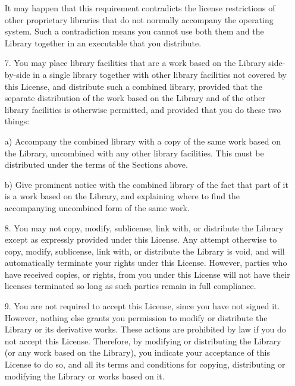 \begin{multicols}{3}
\begin{itemize}
   It may happen that this requirement contradicts the license restrictions
   of other proprietary libraries that do not normally accompany the
   operating system. Such a contradiction means you cannot use both them
   and the Library together in an executable that you distribute.
   
 \item[7.] You may place library facilities that are a work based on
   the Library side-by-side in a single library together with other
   library facilities not covered by this License, and distribute such
   a combined library, provided that the separate distribution of the
   work based on the Library and of the other library facilities is
   otherwise permitted, and provided that you do these two things:

      a) Accompany the combined library with a copy of the same work based
	 on the Library, uncombined with any other library facilities. This
	 must be distributed under the terms of the Sections above.

      b) Give prominent notice with the combined library of the fact that
	 part of it is a work based on the Library, and explaining where to
	 find the accompanying uncombined form of the same work.
         
       \item[8.] You may not copy, modify, sublicense, link with, or
         distribute the Library except as expressly provided under
         this License. Any attempt otherwise to copy, modify,
         sublicense, link with, or distribute the Library is void, and
         will automatically terminate your rights under this License.
         However, parties who have received copies, or rights, from
         you under this License will not have their licenses
         terminated so long as such parties remain in full compliance.
         
       \item[9.] You are not required to accept this License, since
         you have not signed it. However, nothing else grants you
         permission to modify or distribute the Library or its
         derivative works. These actions are prohibited by law if you
         do not accept this License. Therefore, by modifying or
         distributing the Library (or any work based on the Library),
         you indicate your acceptance of this License to do so, and
         all its terms and conditions for copying, distributing or
         modifying the Library or works based on it.
         

\end{itemize}
\end{multicols}
